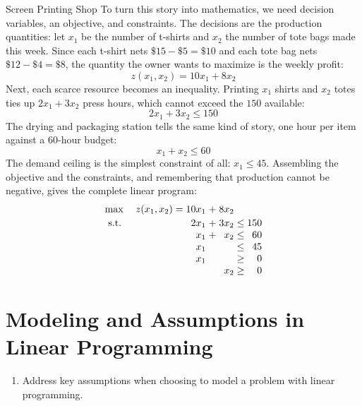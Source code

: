 \begin{examplewithallcode}{Screen Printing Shop}
To turn this story into mathematics, we need decision variables, an objective, and constraints. The decisions are the production quantities: let $x_1$ be the number of t-shirts and $x_2$ the number of tote bags made this week. Since each t-shirt nets $\$15 - \$5 = \$10$ and each tote bag nets $\$12 - \$4 = \$8$, the quantity the owner wants to maximize is the weekly profit:
\begin{equation}
z(x_1,x_2) = 10x_1 + 8x_2
\end{equation}
Next, each scarce resource becomes an inequality. Printing $x_1$ shirts and $x_2$ totes ties up $2x_1 + 3x_2$ press hours, which cannot exceed the $150$ available:
\begin{equation}
2x_1 + 3x_2 \leq 150
\end{equation}
The drying and packaging station tells the same kind of story, one hour per item against a $60$-hour budget:
\begin{equation}
x_1 + x_2 \leq 60
\end{equation}
The demand ceiling is the simplest constraint of all: $x_1 \leq 45$. Assembling the objective and the constraints, and remembering that production cannot be negative, gives the complete linear program:
\begin{equation}
\begin{array}{l r@{\;}c@{\;}r@{\;}c@{\;}r}
\max & z(x_1,x_2) = 10x_1 & + & 8x_2 & & \\[2pt]
\st  & 2x_1 & + & 3x_2 & \leq & 150 \\
     & x_1  & + & x_2  & \leq & 60  \\
     & x_1  &   &      & \leq & 45  \\
     & x_1  &   &      & \geq & 0   \\
     &      &   & x_2  & \geq & 0
\end{array}
\label{eqn:ScreenPrintEx}
\end{equation}
\label{ex:ScreenPrint}
\end{examplewithallcode}

\section{Modeling and Assumptions in Linear Programming}
\label{sec:lp-modeling-assumptions}

\begin{outcome}
\begin{enumerate}
\item Address key assumptions when choosing to model a problem with linear programming.
\end{enumerate}
\end{outcome}

